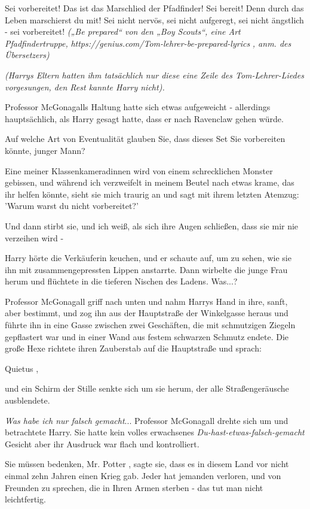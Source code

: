 Sei vorbereitet! Das ist das Marschlied der Pfadfinder! Sei bereit! Denn durch
das Leben marschierst du mit! Sei nicht nervös, sei nicht aufgeregt, sei
nicht ängstlich - sei vorbereitet!\grqq{} \emph{(„Be prepared“ von den „Boy
Scouts“, eine Art Pfadfindertruppe,
}\emph{https://genius.com/Tom-lehrer-be-prepared-lyrics}\emph{ , anm. des
Übersetzers)}

\emph{(Harrys Eltern hatten ihm tatsächlich nur diese eine Zeile des
Tom-Lehrer-Liedes vorgesungen, den Rest kannte Harry nicht). }

Professor McGonagalls Haltung hatte sich etwas aufgeweicht - allerdings
hauptsächlich, als Harry gesagt hatte, dass er nach Ravenclaw gehen würde.

\glqq Auf welche Art von Eventualität glauben Sie, dass dieses Set Sie
vorbereiten könnte, junger Mann?\grqq{}

\glqq Eine meiner Klassenkameradinnen wird von einem schrecklichen Monster
gebissen, und während ich verzweifelt in meinem Beutel nach etwas krame, das
ihr helfen könnte, sieht sie mich traurig an und sagt mit ihrem letzten
Atemzug: 'Warum warst du nicht vorbereitet?'

Und dann stirbt sie, und ich weiß, als sich ihre Augen schließen, dass sie mir
nie verzeihen wird -\grqq{}

Harry hörte die Verkäuferin keuchen, und er schaute auf, um zu sehen, wie sie
ihn mit zusammengepressten Lippen anstarrte. Dann wirbelte die junge Frau
herum und flüchtete in die tieferen Nischen des Ladens. Was...?

Professor McGonagall griff nach unten und nahm Harrys Hand in ihre, sanft, aber
bestimmt, und zog ihn aus der Hauptstraße der Winkelgasse heraus und führte
ihn in eine Gasse zwischen zwei Geschäften, die mit schmutzigen Ziegeln
gepflastert war und in einer Wand aus festem schwarzen Schmutz endete. Die
große Hexe richtete ihren Zauberstab auf die Hauptstraße und sprach:

\glqq Quietus\grqq{} ,

und ein Schirm der Stille senkte sich um sie herum, der alle Straßengeräusche
ausblendete.

\emph{Was habe ich nur falsch gemacht}... Professor McGonagall drehte sich um
und betrachtete Harry. Sie hatte kein volles erwachsenes
\emph{Du-hast-etwas-falsch-gemacht }Gesicht aber ihr Ausdruck war flach und
kontrolliert.

\glqq Sie müssen bedenken, Mr. Potter\grqq{} , sagte sie, \glqq dass es in
diesem Land vor nicht einmal zehn Jahren einen Krieg gab. Jeder hat jemanden
verloren, und von Freunden zu sprechen, die in Ihren Armen sterben - das tut
man nicht leichtfertig.\grqq{}

